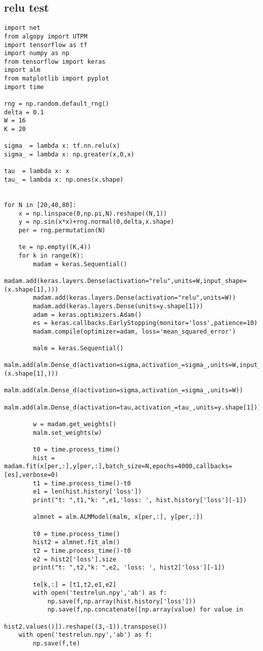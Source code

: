 \subsection{relu test}
\begin{verbatim}
import net
from algopy import UTPM
import tensorflow as tf
import numpy as np
from tensorflow import keras
import alm
from matplotlib import pyplot
import time

rng = np.random.default_rng()
delta = 0.1
W = 16
K = 20

sigma  = lambda x: tf.nn.relu(x)
sigma_ = lambda x: np.greater(x,0,x)

tau  = lambda x: x
tau_ = lambda x: np.ones(x.shape)


for N in [20,40,80]:
    x = np.linspace(0,np.pi,N).reshape((N,1))
    y = np.sin(x*x)+rng.normal(0,delta,x.shape)
    per = rng.permutation(N)

    te = np.empty((K,4))
    for k in range(K):
        madam = keras.Sequential() 
        madam.add(keras.layers.Dense(activation="relu",units=W,input_shape=(x.shape[1],)))
        madam.add(keras.layers.Dense(activation="relu",units=W))
        madam.add(keras.layers.Dense(units=y.shape[1]))
        adam = keras.optimizers.Adam()
        es = keras.callbacks.EarlyStopping(monitor='loss',patience=10)
        madam.compile(optimizer=adam, loss='mean_squared_error')

        malm = keras.Sequential()
        malm.add(alm.Dense_d(activation=sigma,activation_=sigma_,units=W,input_shape=(x.shape[1],)))
        malm.add(alm.Dense_d(activation=sigma,activation_=sigma_,units=W))
        malm.add(alm.Dense_d(activation=tau,activation_=tau_,units=y.shape[1]))
    
        w = madam.get_weights()
        malm.set_weights(w)
        
        t0 = time.process_time()
        hist = madam.fit(x[per,:],y[per,:],batch_size=N,epochs=4000,callbacks=[es],verbose=0)
        t1 = time.process_time()-t0
        e1 = len(hist.history['loss'])
        print("t: ",t1,"k: ",e1,'loss: ', hist.history['loss'][-1])

        almnet = alm.ALMModel(malm, x[per,:], y[per,:])

        t0 = time.process_time()
        hist2 = almnet.fit_alm()
        t2 = time.process_time()-t0
        e2 = hist2['loss'].size
        print("t: ",t2,"k: ",e2, 'loss: ', hist2['loss'][-1])
    
        te[k,:] = [t1,t2,e1,e2]
        with open('testrelun.npy','ab') as f:
            np.save(f,np.array(hist.history['loss']))
            np.save(f,np.concatenate([np.array(value) for value in 
                                      hist2.values()]).reshape((3,-1)).transpose())
    with open('testrelun.npy','ab') as f:
        np.save(f,te)
\end{verbatim}


